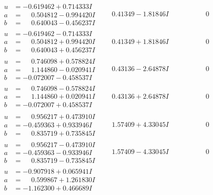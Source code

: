 \documentclass[1p]{elsarticle_modified}
\theoremstyle{definition}
\begin{document}
$$\begin{array}{c|c|c}
\begin{aligned}
u &= -0.619462 + 0.714333 I \\
a &= \phantom{-}0.504812 - 0.994420 I \\
b &= \phantom{-}0.640043 - 0.456237 I\end{aligned}
 & \phantom{-}0.41349 - 1.81846 I & \phantom{-0.000000 } 0 \\ \hline\begin{aligned}
u &= -0.619462 - 0.714333 I \\
a &= \phantom{-}0.504812 + 0.994420 I \\
b &= \phantom{-}0.640043 + 0.456237 I\end{aligned}
 & \phantom{-}0.41349 + 1.81846 I & \phantom{-0.000000 } 0 \\ \hline\begin{aligned}
u &= \phantom{-}0.746098 + 0.578824 I \\
a &= \phantom{-}1.144860 - 0.020941 I \\
b &= -0.072007 - 0.458537 I\end{aligned}
 & \phantom{-}0.43136 - 2.64878 I & \phantom{-0.000000 } 0 \\ \hline\begin{aligned}
u &= \phantom{-}0.746098 - 0.578824 I \\
a &= \phantom{-}1.144860 + 0.020941 I \\
b &= -0.072007 + 0.458537 I\end{aligned}
 & \phantom{-}0.43136 + 2.64878 I & \phantom{-0.000000 } 0 \\ \hline\begin{aligned}
u &= \phantom{-}0.956217 + 0.473910 I \\
a &= -0.459363 + 0.933946 I \\
b &= \phantom{-}0.835719 + 0.735845 I\end{aligned}
 & \phantom{-}1.57409 + 4.33045 I & \phantom{-0.000000 } 0 \\ \hline\begin{aligned}
u &= \phantom{-}0.956217 - 0.473910 I \\
a &= -0.459363 - 0.933946 I \\
b &= \phantom{-}0.835719 - 0.735845 I\end{aligned}
 & \phantom{-}1.57409 - 4.33045 I & \phantom{-0.000000 } 0 \\ \hline\begin{aligned}
u &= -0.907918 + 0.065941 I \\
a &= \phantom{-}0.599867 + 1.261830 I \\
b &= -1.162300 + 0.466689 I\end{aligned}

\end{array}$$
\end{document}
